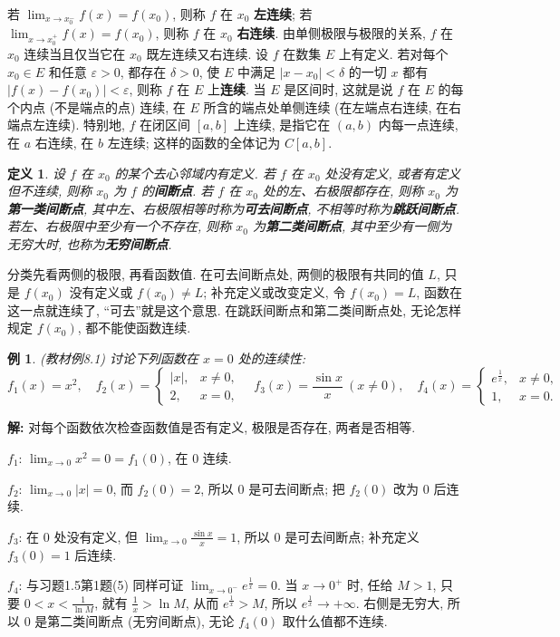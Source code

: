 \documentclass[UTF8,openany]{ctexbook}
\theoremstyle{chinesetextbook}
\newtheorem{definition}{定义}[section]
\newtheorem{example}{例}[section]
\newenvironment{cnsolution}{\par\indent\textbf{解:} \ignorespaces}{\par}
\begin{document}
若 $\displaystyle\lim_{x\to x_0^-}f(x)=f(x_0)$, 则称 $f$ 在 $x_0$ \textbf{左连续}; 若 $\displaystyle\lim_{x\to x_0^+}f(x)=f(x_0)$, 则称 $f$ 在 $x_0$ \textbf{右连续}. 由单侧极限与极限的关系, $f$ 在 $x_0$ 连续当且仅当它在 $x_0$ 既左连续又右连续. 设 $f$ 在数集 $E$ 上有定义. 若对每个 $x_0\in E$ 和任意 $\varepsilon>0$, 都存在 $\delta>0$, 使 $E$ 中满足 $|x-x_0|<\delta$ 的一切 $x$ 都有 $|f(x)-f(x_0)|<\varepsilon$, 则称 $f$ 在 $E$ 上\textbf{连续}. 当 $E$ 是区间时, 这就是说 $f$ 在 $E$ 的每个内点 (不是端点的点) 连续, 在 $E$ 所含的端点处单侧连续 (在左端点右连续, 在右端点左连续). 特别地, $f$ 在闭区间 $[a,b]$ 上连续, 是指它在 $(a,b)$ 内每一点连续, 在 $a$ 右连续, 在 $b$ 左连续; 这样的函数的全体记为 $C[a,b]$.
\begin{definition}
设 $f$ 在 $x_0$ 的某个去心邻域内有定义. 若 $f$ 在 $x_0$ 处没有定义, 或者有定义但不连续, 则称 $x_0$ 为 $f$ 的\textbf{间断点}. 若 $f$ 在 $x_0$ 处的左、右极限都存在, 则称 $x_0$ 为\textbf{第一类间断点}, 其中左、右极限相等时称为\textbf{可去间断点}, 不相等时称为\textbf{跳跃间断点}. 若左、右极限中至少有一个不存在, 则称 $x_0$ 为\textbf{第二类间断点}, 其中至少有一侧为无穷大时, 也称为\textbf{无穷间断点}.
\end{definition}
分类先看两侧的极限, 再看函数值. 在可去间断点处, 两侧的极限有共同的值 $L$, 只是 $f(x_0)$ 没有定义或 $f(x_0)\ne L$; 补充定义或改变定义, 令 $f(x_0)=L$, 函数在这一点就连续了, “可去”就是这个意思. 在跳跃间断点和第二类间断点处, 无论怎样规定 $f(x_0)$, 都不能使函数连续.
\begin{example}
\textnormal{(教材例8.1)} 讨论下列函数在 $x=0$ 处的连续性:
\[
f_1(x)=x^2,\quad f_2(x)=\begin{cases}|x|,&x\ne0,\\2,&x=0,\end{cases}\quad f_3(x)=\frac{\sin x}x\ (x\ne0),\quad f_4(x)=\begin{cases}e^{\frac1x},&x\ne0,\\1,&x=0.\end{cases}
\]
\end{example}
\begin{cnsolution}
对每个函数依次检查函数值是否有定义, 极限是否存在, 两者是否相等.

$f_1$: $\displaystyle\lim_{x\to0}x^2=0=f_1(0)$, 在 $0$ 连续.

$f_2$: $\displaystyle\lim_{x\to0}|x|=0$, 而 $f_2(0)=2$, 所以 $0$ 是可去间断点; 把 $f_2(0)$ 改为 $0$ 后连续.

$f_3$: 在 $0$ 处没有定义, 但 $\displaystyle\lim_{x\to0}\frac{\sin x}x=1$, 所以 $0$ 是可去间断点; 补充定义 $f_3(0)=1$ 后连续.

$f_4$: 与习题1.5第1题(5) 同样可证 $\displaystyle\lim_{x\to0^-}e^{\frac1x}=0$. 当 $x\to0^+$ 时, 任给 $M>1$, 只要 $\displaystyle0<x<\frac1{\ln M}$, 就有 $\displaystyle\frac1x>\ln M$, 从而 $e^{\frac1x}>M$, 所以 $e^{\frac1x}\to+\infty$. 右侧是无穷大, 所以 $0$ 是第二类间断点 (无穷间断点), 无论 $f_4(0)$ 取什么值都不连续.
\end{cnsolution}
\end{document}
